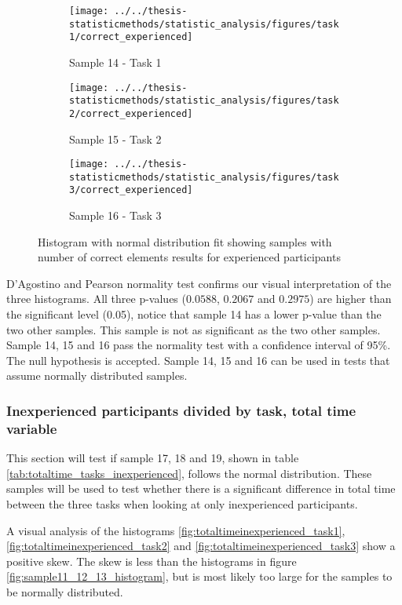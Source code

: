 \begin{figure}[H]
	\centering
	\begin{subfigure}[b]{0.32\textwidth}
		\centering
		\texttt{[image: ../../thesis-statisticmethods/statistic\_analysis/figures/task1/correct\_experienced]}
		\caption{Sample 14 - Task 1}
		\label{fig:correctexperienced_task1}
	\end{subfigure}
	\begin{subfigure}[b]{0.32\textwidth}
		\centering
		\texttt{[image: ../../thesis-statisticmethods/statistic\_analysis/figures/task2/correct\_experienced]}
		\caption{Sample 15 - Task 2}
		\label{fig:correctexperienced_task2}
	\end{subfigure}
	\begin{subfigure}[b]{0.32\textwidth}
		\centering
		\texttt{[image: ../../thesis-statisticmethods/statistic\_analysis/figures/task3/correct\_experienced]}
		\caption{Sample 16 - Task 3}
		\label{fig:correctexperienced_task3}
	\end{subfigure}
	\caption{Histogram with normal distribution fit showing samples with number of correct elements results for experienced participants}
	\label{fig:sample14,15,16_normhistogram}
\end{figure}

 D'Agostino and Pearson normality test confirms our visual interpretation of the three histograms. All three p-values ($0.0588$, $0.2067$ and $0.2975$) are higher than the significant level (0.05), notice that sample 14 has a lower p-value than the two other samples. This sample is not as significant as the two other samples. Sample 14, 15 and 16 pass the normality test with a confidence interval of 95\%. The null hypothesis is accepted. Sample 14, 15 and 16 can be used in tests that assume normally distributed samples.

\subsubsection[Sample 17, 18 and 19]{Inexperienced participants divided by task, total time variable}\label{sec:sample_17,18,19_normalitytest}
This section will test if sample 17, 18 and 19, shown in table \ref{tab:totaltime_tasks_inexperienced}, follows the normal distribution. These samples will be used to test whether there is a significant difference in total time between the three tasks when looking at only inexperienced participants.

A visual analysis of the histograms \ref{fig:totaltimeinexperienced_task1}, \ref{fig:totaltimeinexperienced_task2} and \ref{fig:totaltimeinexperienced_task3} show a positive skew. The skew is less than the histograms in figure \ref{fig:sample11_12_13_histogram}, but is most likely too large for the samples to be normally distributed.

